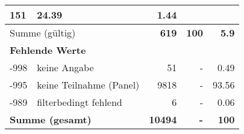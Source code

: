 \begin{longtable}{lXrrr}
       \num{151} &
       \num[round-mode=places,round-precision=2]{24.39} &
         \num[round-mode=places,round-precision=2]{1.44} \\
     \midrule
     \multicolumn{2}{l}{Summe (gültig)} &
       \textbf{\num{619}} &
     \textbf{\num{100}} &
       \textbf{\num[round-mode=places,round-precision=2]{5.9}} \\
     \multicolumn{5}{l}{\textbf{Fehlende Werte}}\\
       -998 &
       keine Angabe &
         \num{51} &
        - &
         \num[round-mode=places,round-precision=2]{0.49} \\
       -995 &
       keine Teilnahme (Panel) &
         \num{9818} &
        - &
         \num[round-mode=places,round-precision=2]{93.56} \\
       -989 &
       filterbedingt fehlend &
         \num{6} &
        - &
         \num[round-mode=places,round-precision=2]{0.06} \\
     \midrule
     \multicolumn{2}{l}{\textbf{Summe (gesamt)}} &
          \textbf{\num{10494}} &
        \textbf{-} &
        \textbf{\num{100}} \\
     \bottomrule
     \end{longtable}
     
